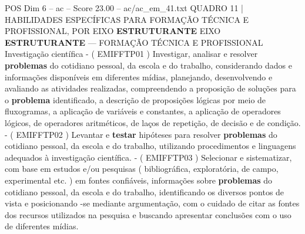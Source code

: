 \begin{textsample}{POS Dim 6 – ac – Score 23.00 – ac/ac\_em\_41.txt}
QUADRO 11 | HABILIDADES ESPECÍFICAS PARA FORMAÇÃO TÉCNICA E PROFISSIONAL, POR EIXO \textbf{ESTRUTURANTE} EIXO \textbf{ESTRUTURANTE} — FORMAÇÃO TÉCNICA E PROFISSIONAL Investigação científica - ( EMIFFTP01 ) Investigar, analisar e resolver \textbf{problemas} do cotidiano pessoal, da escola e do trabalho, considerando dados e informações disponíveis em diferentes mídias, planejando, desenvolvendo e avaliando as atividades realizadas, compreendendo a proposição de soluções para o \textbf{problema} identificado, a descrição de proposições lógicas por meio de fluxogramas, a aplicação de variáveis e constantes, a aplicação de operadores lógicos, de operadores aritméticos, de laços de repetição, de decisão e de condição. - ( EMIFFTP02 ) Levantar e \textbf{testar} hipóteses para resolver \textbf{problemas} do cotidiano pessoal, da escola e do trabalho, utilizando procedimentos e linguagens adequados à investigação científica. - ( EMIFFTP03 ) Selecionar e sistematizar, com base em estudos e/ou pesquisas ( bibliográfica, exploratória, de campo, experimental etc. ) em fontes confiáveis, informações sobre \textbf{problemas} do cotidiano pessoal, da escola e do trabalho, identificando os diversos pontos de vista e posicionando -se mediante argumentação, com o cuidado de citar as fontes dos recursos utilizados na pesquisa e buscando apresentar conclusões com o uso de diferentes mídias.

\end{textsample}
